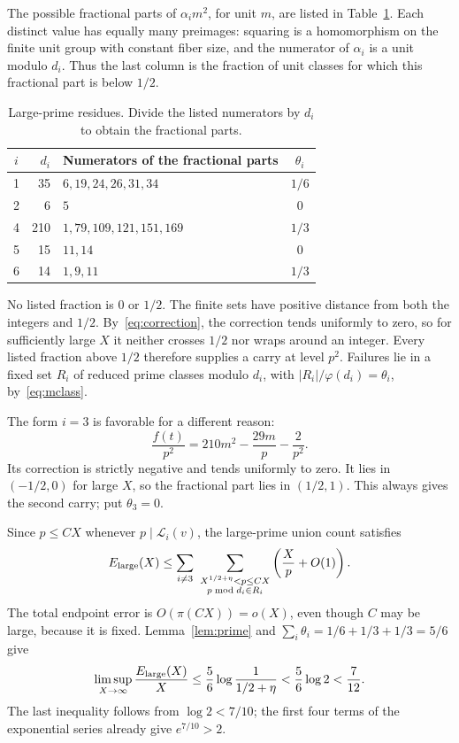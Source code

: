 \documentclass[11pt,a4paper]{article}
\newcommand{\LL}{\mathcal L}
\newcommand{\1}{\mathbf 1}
\numberwithin{equation}{section}
\begin{document}
The possible fractional parts of \(\alpha_i m^2\), for unit \(m\), are
listed in Table~\ref{tab:residues}. Each distinct value has equally many
preimages: squaring is a homomorphism on the finite unit group with
constant fiber size, and the numerator of \(\alpha_i\) is a unit modulo
\(d_i\). Thus the last column is the fraction of unit classes for which
this fractional part is below \(1/2\).
\begin{table}[ht]
\centering
\caption{Large-prime residues. Divide the listed numerators by \(d_i\)
to obtain the fractional parts.}
\label{tab:residues}
\begin{tabular}{@{}crlc@{}}
\toprule
\(i\)&\(d_i\)&Numerators of the fractional parts&\(\theta_i\)\\
\midrule
1&35&\(6,19,24,26,31,34\)&\(1/6\)\\
2&6&\(5\)&0\\
4&210&\(1,79,109,121,151,169\)&\(1/3\)\\
5&15&\(11,14\)&0\\
6&14&\(1,9,11\)&\(1/3\)\\
\bottomrule
\end{tabular}
\end{table}

No listed fraction is \(0\) or \(1/2\). The finite sets have positive
distance from both the integers and \(1/2\). By~\eqref{eq:correction},
the correction tends uniformly to zero, so for sufficiently large \(X\)
it neither crosses \(1/2\) nor wraps around an integer. Every listed
fraction above \(1/2\) therefore supplies a carry at level \(p^2\).
Failures lie in a fixed set \(R_i\) of reduced prime classes modulo
\(d_i\), with \(|R_i|/\varphi(d_i)=\theta_i\), by~\eqref{eq:mclass}.

The form \(i=3\) is favorable for a different reason:
\[
 \frac{f(t)}{p^2}=210m^2-\frac{29m}{p}-\frac2{p^2}.
\]
Its correction is strictly negative and tends uniformly to zero. It
lies in \((-1/2,0)\) for large \(X\), so the fractional part lies in
\((1/2,1)\). This always gives the second carry; put \(\theta_3=0\).

Since \(p\leq CX\) whenever \(p\mid\LL_i(v)\), the large-prime union count
satisfies
\[
 E_{\rm large}(X)\leq
 \sum_{i\neq3}\ \sum_{\substack{X^{1/2+\eta}<p\leq CX\\
                          p\bmod d_i\in R_i}}
                      \left(\frac Xp+O(1)\right).
\]
The total endpoint error is \(O(\pi(CX))=o(X)\), even though \(C\) may
be large, because it is fixed. Lemma~\ref{lem:prime} and
\(\sum_i\theta_i=1/6+1/3+1/3=5/6\) give
\begin{equation}\label{eq:large}
 \limsup_{X\to\infty}\frac{E_{\rm large}(X)}X
 \leq\frac56\log\frac1{1/2+\eta}
 <\frac56\log2<\frac7{12}.
\end{equation}
The last inequality follows from \(\log2<7/10\); the first four terms
of the exponential series already give \(e^{7/10}>2\).
\end{document}
